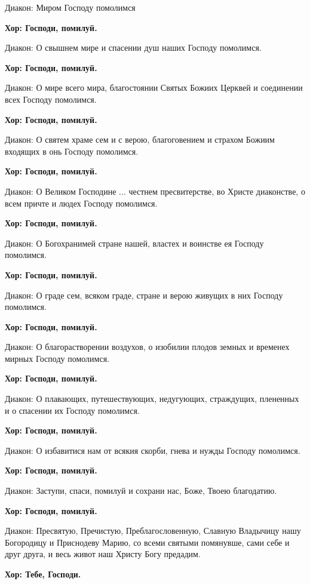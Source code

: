 \documentclass[12pt,a4paper,titlepage]{report}
\begin{document}
\begin{paracol}[1]{2}
	Диакон: Миром Господу помолимся
	
	\textbf{Хор: Господи, помилуй.}
	
	Диакон: О свышнем мире и спасении душ наших Господу помолимся.
	
	\textbf{Хор: Господи, помилуй.}
	
	Диакон: О мире всего мира, благостоянии Святых Божиих Церквей и соединении всех Господу помолимся.
	
	\textbf{Хор: Господи, помилуй.}
	
	Диакон: О святем храме сем и с верою, благоговением и страхом Божиим входящих в онь Господу помолимся.
	
	\textbf{Хор: Господи, помилуй.}
	
	Диакон: О Великом Господине ... честнем пресвитерстве, во Христе диаконстве, о всем причте и людех Господу помолимся.
	
	\textbf{Хор: Господи, помилуй.}
	
	Диакон: О Богохранимей стране нашей, властех и воинстве ея Господу помолимся.
	
	\textbf{Хор: Господи, помилуй.}
	
	Диакон: О граде сем, всяком граде, стране и верою живущих в них Господу помолимся.
	
	\textbf{Хор: Господи, помилуй.}
	
	Диакон: О благорастворении воздухов, о изобилии плодов земных и временех мирных Господу помолимся.
	
	\textbf{Хор: Господи, помилуй.}
	
	Диакон: О плавающих, путешествующих, недугующих, страждущих, плененных и о спасении их Господу помолимся.
	
	\textbf{Хор: Господи, помилуй.}
	
	Диакон: О избавитися нам от всякия скорби, гнева и нужды Господу помолимся.
	
	\textbf{Хор: Господи, помилуй.}
	
	Диакон: Заступи, спаси, помилуй и сохрани нас, Боже, Твоею благодатию.
	
	\textbf{Хор: Господи, помилуй.}
	
	Диакон: Пресвятую, Пречистую, Преблагословенную, Славную Владычицу нашу Богородицу и Приснодеву Марию, со всеми святыми помянувше, сами себе и друг друга, и весь живот наш Христу Богу предадим.
	
	\textbf{Хор: Тебе, Господи.}
	

\end{paracol}
\end{document}
